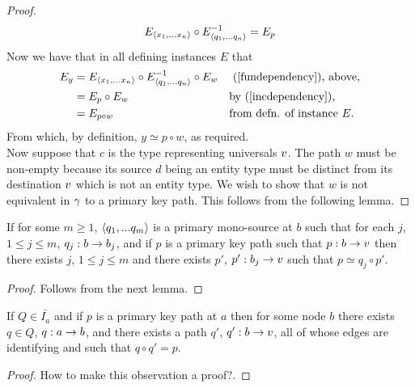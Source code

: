 \begin{proof}
\begin{equation}
\label{incdependency}
E_{\langle x_1,...x_n\rangle} \circ E^{-1}_{\langle q_1,...q_n\rangle} = E_p
\end{equation}
Now we have  that in all defining instances $E$ that 
\begin{align*}
E_y &= E_{\langle x_1,...x_n\rangle} \circ E_{\langle q_1,...q_n\rangle}^{-1} \circ E_w  && \text{ (\ref{fundependency}), above,}\\
    &= E_p \circ E_w                                   && \text{by (\ref{incdependency}),}\\
		&= E_{p \circ w}                                   && \text{from defn. of instance }E.\\
\end{align*} 
\vspace{-0.3cm}
From which, by definition, $y\simeq p \circ w$, as required. \\

Now suppose that $c$ is the type representing universals $v$. The path $w$ must be non-empty because its source $d$ being 
an entity type must be distinct from its destination $v$ which is not an entity type. 
We wish to show that $w$ is not equivalent in $\gamma$ to
a primary key path. This follows from the following lemma.
\end{proof}

\begin{lemma}
If for some $m \geq 1$, $\langle q_1,...q_m\rangle$ is a primary mono-source at $b$ such that for each $j$, $1 \leq j \leq m$, $q_j : b \rightarrow b_j$,
and if  $p$ is a primary key path such that $p: b \rightarrow v$   
then there exists $j$, $1 \leq j \leq m$ and there exists $p'$, $p': b_j \rightarrow v$ such that $p \simeq q_j \circ p'$.
\end{lemma}
\begin{proof}
Follows from the next lemma.
\end{proof}

\begin{lemma}
If $Q \in \bar{I_a}$ and if $p$ is a primary key path at $a$ then for some node $b$ there exists $q \in Q$, $q: a \rightarrow b$, and there exists 
a path $q'$, $q': b \rightarrow v$,  all of whose edges are identifying and such that $q \circ q' = p$. 
\end{lemma}
\begin{proof}
How to make this observation a proof?.
\end{proof}

